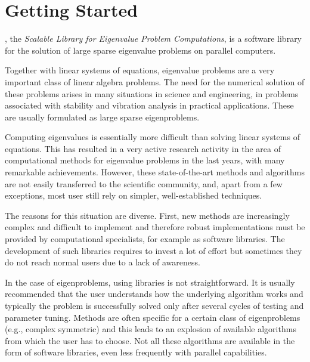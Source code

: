 \chapter{\label{cap:int}Getting Started}

\noindent \slepc, the {\em Scalable Library for Eigenvalue Problem Computations}, is a software library for the solution of large sparse eigenvalue problems on parallel computers. 

	Together with linear systems of equations, eigenvalue problems are a very important class of linear algebra problems. The need for the numerical solution of these problems arises in many situations in science and engineering, in problems associated with stability and vibration analysis in practical applications. These are usually formulated as large sparse eigenproblems.

	Computing eigenvalues is essentially more difficult than solving linear systems of equations. This has resulted in a very active research activity in the area of computational methods for eigenvalue problems in the last years, with many remarkable achievements.  However, these state-of-the-art methods and algorithms are not easily transferred to the scientific community, and, apart from a few exceptions, most user still rely on simpler, well-established techniques.
	
	The reasons for this situation are diverse. First, new methods are increasingly complex and difficult to implement and therefore robust implementations must be provided by computational specialists, for example as software libraries. The development of such libraries requires to invest a lot of effort but sometimes they do not reach normal users due to a lack of awareness.
	
	In the case of eigenproblems, using libraries is not straightforward. It is usually recommended that the user understands how the underlying algorithm works and typically the problem is successfully solved only after several cycles of testing and parameter tuning. Methods are often specific for a certain class of eigenproblems (e.g., complex symmetric) and this leads to an explosion of available algorithms from which the user has to choose. Not all these algorithms are available in the form of software libraries, even less frequently with parallel capabilities.
	
